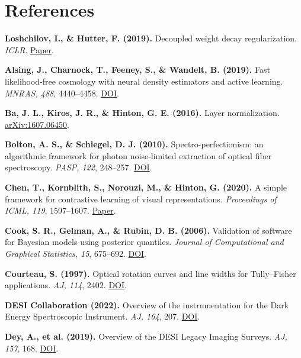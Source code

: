 \documentclass[11pt]{article}
\begin{document}
\section*{References}
\hypertarget{ref:adamw}{}%
\textbf{Loshchilov, I., \& Hutter, F. (2019).} Decoupled weight decay regularization. \emph{ICLR}. \href{https://openreview.net/forum?id=Bkg6RiCqY7}{Paper}.\par
\hypertarget{ref:alsing2019}{}%
\textbf{Alsing, J., Charnock, T., Feeney, S., \& Wandelt, B. (2019).} Fast likelihood-free cosmology with neural density estimators and active learning. \emph{MNRAS, 488}, 4440--4458. \href{https://doi.org/10.1093/mnras/stz1960}{DOI}.\par
\hypertarget{ref:ba2016}{}%
\textbf{Ba, J. L., Kiros, J. R., \& Hinton, G. E. (2016).} Layer normalization. \href{https://arxiv.org/abs/1607.06450}{arXiv:1607.06450}.\par
\hypertarget{ref:bolton2010}{}%
\textbf{Bolton, A. S., \& Schlegel, D. J. (2010).} Spectro-perfectionism: an algorithmic framework for photon noise-limited extraction of optical fiber spectroscopy. \emph{PASP, 122}, 248--257. \href{https://doi.org/10.1086/651008}{DOI}.\par
\hypertarget{ref:chen2020}{}%
\textbf{Chen, T., Kornblith, S., Norouzi, M., \& Hinton, G. (2020).} A simple framework for contrastive learning of visual representations. \emph{Proceedings of ICML, 119}, 1597--1607. \href{https://proceedings.mlr.press/v119/chen20j.html}{Paper}.\par
\hypertarget{ref:cook2006}{}%
\textbf{Cook, S. R., Gelman, A., \& Rubin, D. B. (2006).} Validation of software for Bayesian models using posterior quantiles. \emph{Journal of Computational and Graphical Statistics, 15}, 675--692. \href{https://doi.org/10.1198/106186006X136976}{DOI}.\par
\hypertarget{ref:courteau1997}{}%
\textbf{Courteau, S. (1997).} Optical rotation curves and line widths for Tully--Fisher applications. \emph{AJ, 114}, 2402. \href{https://doi.org/10.1086/118656}{DOI}.\par
\hypertarget{ref:desi2022}{}%
\textbf{DESI Collaboration (2022).} Overview of the instrumentation for the Dark Energy Spectroscopic Instrument. \emph{AJ, 164}, 207. \href{https://doi.org/10.3847/1538-3881/ac882b}{DOI}.\par
\hypertarget{ref:dey2019}{}%
\textbf{Dey, A., et al. (2019).} Overview of the DESI Legacy Imaging Surveys. \emph{AJ, 157}, 168. \href{https://doi.org/10.3847/1538-3881/ab089d}{DOI}.\par
\end{document}
